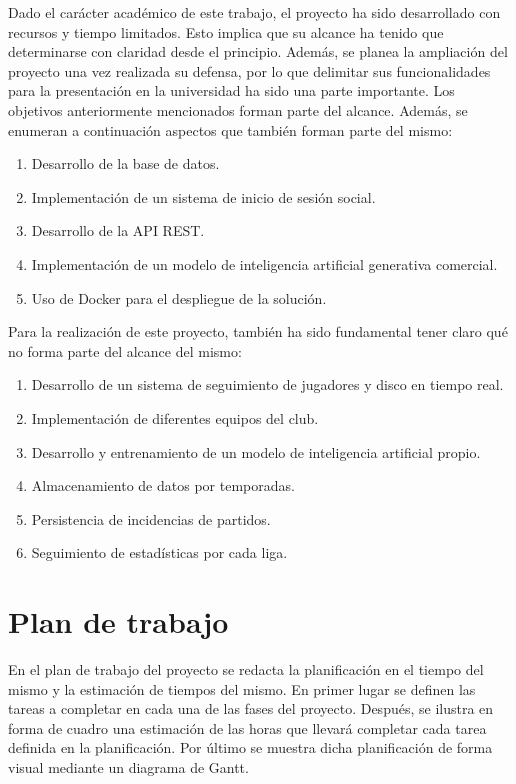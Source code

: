 Dado el carácter académico de este trabajo, el proyecto ha sido desarrollado con recursos y tiempo limitados. Esto implica que su alcance ha tenido que determinarse con claridad desde el principio. Además, se planea la ampliación del proyecto una vez realizada su defensa, por lo que delimitar sus funcionalidades para la presentación en la universidad ha sido una parte importante. Los objetivos anteriormente mencionados forman parte del alcance. Además, se enumeran a continuación aspectos que también forman parte del mismo:

\begin{enumerate}
  \item Desarrollo de la base de datos.
  \item Implementación de un sistema de inicio de sesión social.
  \item Desarrollo de la API REST.
  \item Implementación de un modelo de inteligencia artificial generativa comercial.
  \item Uso de Docker para el despliegue de la solución.
\end{enumerate}

Para la realización de este proyecto, también ha sido fundamental tener claro qué no forma parte del alcance del mismo:

\begin{enumerate}
  \item Desarrollo de un sistema de seguimiento de jugadores y disco en tiempo real.
  \item Implementación de diferentes equipos del club.
  \item Desarrollo y entrenamiento de un modelo de inteligencia artificial propio.
  \item Almacenamiento de datos por temporadas.
  \item Persistencia de incidencias de partidos.
  \item Seguimiento de estadísticas por cada liga.
\end{enumerate}

\chapter{Plan de trabajo}

En el plan de trabajo del proyecto se redacta la planificación en el tiempo del mismo y la estimación de tiempos del mismo. En primer lugar se definen las tareas a completar en cada una de las fases del proyecto. Después, se ilustra en forma de cuadro una estimación de las horas que llevará completar cada tarea definida en la planificación. Por último se muestra dicha planificación de forma visual mediante un diagrama de Gantt.

